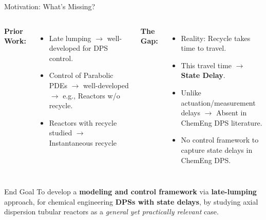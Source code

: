 \documentclass[8pt]{beamer}
\let\oldcitep\citep
\renewcommand{\citep}[1]{\textcolor{gray}{\oldcitep{#1}}}
\begin{document}
\begin{frame}{Motivation: What's Missing?}
\begin{columns}[t]
\textbf{Prior Work:}
\begin{itemize}
    \item Late lumping $\rightarrow$ well-developed for DPS control. \citep{curtainbook,Christofides2012book}
    \item Control of Parabolic PDEs $\rightarrow$ well-developed $\rightarrow$ e.g., Reactors w/o recycle. \citep{liu2014model,xu2017linear}
    \item Reactors with recycle studied \citep{khatibi2021model} $\rightarrow$ Instantaneous recycle
\end{itemize}

\textbf{The Gap:}
\begin{itemize}
    \item Reality: Recycle takes time to travel.
    \item This travel time $\rightarrow$ \textbf{State Delay}.
    \item Unlike actuation/measurement delays $\rightarrow$ Absent in ChemEng DPS literature.
    \item No control framework to capture state delays in ChemEng DPS.
\end{itemize}
\end{columns}
\vspace{2mm}
\begin{block}{End Goal}
To develop a \textbf{modeling and control framework} via \textbf{late-lumping} approach, for chemical engineering \textbf{DPSs with state delays}, by studying axial dispersion tubular reactors as a \textit{general yet practically relevant} case.
\end{block}
\end{frame}

\end{document}
